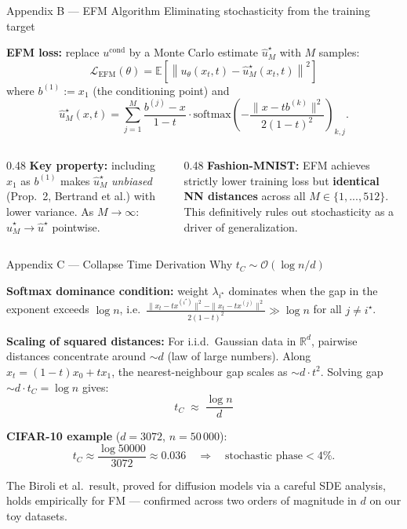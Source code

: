\documentclass[10pt,aspectratio=169]{beamer}
\newcommand{\R}{\mathbb{R}}
\newcommand{\E}{\mathbb{E}}
\newcommand{\cL}{\mathcal{L}}
\newcommand{\norm}[1]{\left\lVert #1 \right\rVert}
\begin{document}
\begin{frame}{Appendix B --- EFM Algorithm}
  {Eliminating stochasticity from the training target}

  \textbf{EFM loss:} replace $u^{\mathrm{cond}}$ by a Monte Carlo
  estimate $\hat{u}^\star_M$ with $M$ samples:
  \[
    \cL_{\mathrm{EFM}}(\theta)
      = \E\!\left[\norm{u_\theta(x_t,t)-\hat{u}^\star_M(x_t,t)}^2\right]
  \]
  where $b^{(1)}:=x_1$ (the conditioning point) and
  \[
    \hat{u}^\star_M(x,t)
      =\sum_{j=1}^M\frac{b^{(j)}-x}{1-t}
       \cdot\mathrm{softmax}\!\left(
         -\frac{\|x-tb^{(k)}\|^2}{2(1-t)^2}
       \right)_{\!k,j}.
  \]

  \begin{columns}[t]
    \begin{column}{0.48\textwidth}
      \textbf{Key property:} including $x_1$ as $b^{(1)}$
      makes $\hat{u}^\star_M$ \emph{unbiased}
      (Prop.~2, Bertrand et al.) with lower variance.
      As $M\to\infty$: $\hat{u}^\star_M\to\hat{u}^\star$ pointwise.
    \end{column}
    \begin{column}{0.48\textwidth}
      \textbf{Fashion-MNIST:} EFM achieves strictly lower
      training loss but \textbf{identical NN distances}
      across all $M\in\{1,...,512\}$.
      This definitively rules out stochasticity as a
      driver of generalization.
    \end{column}
  \end{columns}
\end{frame}

\begin{frame}{Appendix C --- Collapse Time Derivation}
  {Why $t_C\sim\mathcal{O}(\log n/d)$}

  \textbf{Softmax dominance condition:}
  weight $\lambda_{i^\star}$ dominates when the gap in the exponent
  exceeds $\log n$, i.e.\
  $\frac{\|x_t-tx^{(i^\star)}\|^2-\|x_t-tx^{(j)}\|^2}{2(1-t)^2}\gg\log n$
  for all $j\neq i^\star$.

  \medskip
  \textbf{Scaling of squared distances:}
  For i.i.d.\ Gaussian data in $\R^d$, pairwise distances concentrate
  around $\sim d$ (law of large numbers).
  Along $x_t=(1-t)x_0+tx_1$, the nearest-neighbour gap scales
  as $\sim d\cdot t^2$.
  Solving gap $\sim d\cdot t_C=\log n$ gives:
  \[
    \boxed{t_C\;\approx\;\frac{\log n}{d}}
  \]

  \textbf{CIFAR-10 example} ($d=3072$, $n=50\,000$):
  \[
    t_C\approx\frac{\log 50000}{3072}\approx0.036
    \quad\Rightarrow\quad \text{stochastic phase} < 4\%.
  \]

  \begin{resbox}
    \small The Biroli et al.\ result, proved for diffusion models
    via a careful SDE analysis, holds empirically for FM --- confirmed
    across two orders of magnitude in $d$ on our toy datasets.
  \end{resbox}
\end{frame}
\end{document}
